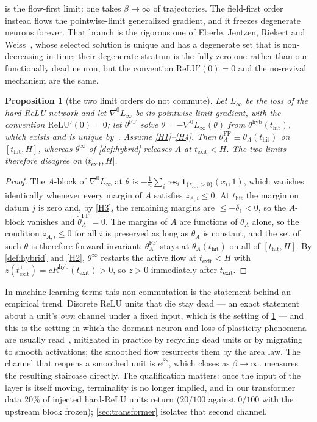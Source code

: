 \documentclass[11pt]{article}
\newtheorem{proposition}[proposition]{Proposition}
\theoremstyle{definition}
\theoremstyle{remark}
\newcommand{\thit}{t_{\mathrm{hit}}}
\newcommand{\texit}{t_{\mathrm{exit}}}
\newcommand{\hyb}{\mathrm{hyb}}
\begin{document}
 is the flow-first limit: one takes $\beta\to\infty$ of
trajectories. The field-first order instead flows the pointwise-limit generalized
gradient, and it freezes degenerate neurons forever. That branch is the rigorous
one of Eberle, Jentzen, Riekert and Weiss~\cite[Theorem 3.3]{EJRW23}, whose
selected solution is unique and has a degenerate set that is non-decreasing in
time; their degenerate stratum is the fully-zero one rather than our functionally
dead neuron, but the convention $\mathrm{ReLU}'(0)=0$ and the no-revival
mechanism are the same.

\begin{proposition}[the two limit orders do not commute]\label{prop:noncomm}
Let $L_\infty$ be the loss of the hard-ReLU network and let $\nabla^0L_\infty$ be
its pointwise-limit gradient, with the convention $\mathrm{ReLU}'(0)=0$; let
$\theta^{\mathrm{FF}}$ solve $\dot\theta=-\nabla^0L_\infty(\theta)$ from
$\theta^{\hyb}(\thit)$, which exists and is unique
by~\cite[Theorem 3.3]{EJRW23}. Assume \eqref{H1}--\eqref{H4}. Then
$\theta_A^{\mathrm{FF}}\equiv\theta_A(\thit)$ on $[\thit,H]$, whereas
$\theta^\infty$ of \cref{def:hybrid} releases $A$ at $\texit<H$. The two limits
therefore disagree on $(\texit,H]$.
\end{proposition}

\begin{proof}
The $A$-block of $\nabla^0L_\infty$ at $\theta$ is
$-\tfrac1n\sum_i\mathrm{res}_i\,\mathbf 1_{\{z_{A,i}>0\}}(x_i,1)$, which vanishes
identically whenever every margin of $A$ satisfies $z_{A,i}\le0$. At $\thit$ the
margin on datum $j$ is zero and, by \eqref{H3}, the remaining margins are
$\le-\delta_1<0$, so the $A$-block vanishes and $\dot\theta_A^{\mathrm{FF}}=0$.
The margins of $A$ are functions of $\theta_A$ alone, so the condition
$z_{A,i}\le0$ for all $i$ is preserved as long as $\theta_A$ is constant, and the
set of such $\theta$ is therefore forward invariant: $\theta_A^{\mathrm{FF}}$
stays at $\theta_A(\thit)$ on all of $[\thit,H]$. By \cref{def:hybrid} and
\eqref{H2}, $\theta^\infty$ restarts the active flow at $\texit<H$ with
$\dot z(\texit^+)=cR^{\hyb}(\texit)>0$, so $z>0$ immediately after $\texit$.
\end{proof}

In machine-learning terms this non-commutation is the statement behind an
empirical trend. Discrete ReLU units that die stay dead --- an exact statement
about a unit's \emph{own} channel under a fixed input, which is the setting of
\cref{prop:noncomm} --- and this is the setting in which the dormant-neuron and
loss-of-plasticity phenomena are usually read~\cite{Sokar23,Lyle23,Dohare24},
mitigated in practice by recycling dead units or by migrating to smooth
activations; the smoothed flow resurrects them by the area law. The channel that
reopens a smoothed unit is $e^{\beta z}$, which closes as $\beta\to\infty$.
 measures the resulting staircase directly. The
qualification matters: once the input of the layer is itself moving, terminality
is no longer implied, and in our transformer data $20\%$ of injected hard-ReLU
units return ($20/100$ against $0/100$ with the upstream block frozen);
\cref{sec:transformer} isolates that second channel.
\end{document}
